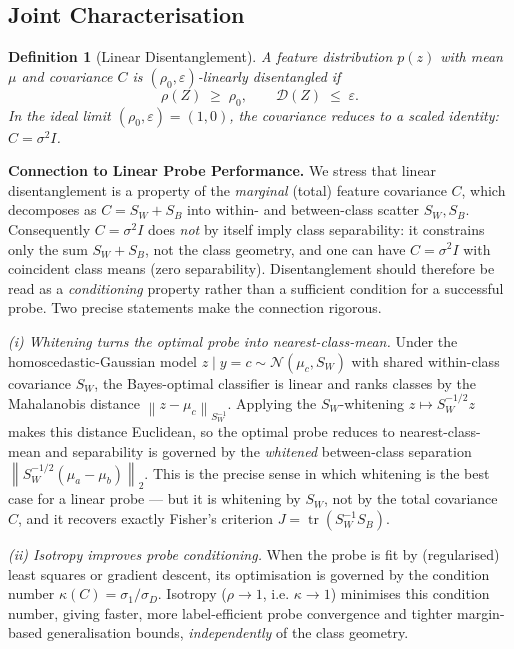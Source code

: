 \documentclass[11pt,a4paper]{article}
\newtheorem{definition}[theorem]{Definition}
\newcommand{\norm}[1]{\left\|#1\right\|}
\newcommand{\tr}{\operatorname{tr}}
\begin{document}
\subsection{Joint Characterisation}
\label{sec:joint}

\begin{definition}[Linear Disentanglement]
\label{def:ld}
A feature distribution $p(z)$ with mean $\mu$ and covariance $C$ is
\emph{$(\rho_0, \varepsilon)$-linearly disentangled} if
\begin{equation}
    \rho(Z) \;\ge\; \rho_0, \qquad
    \mathcal{D}(Z) \;\le\; \varepsilon.
\label{eq:ld_def}
\end{equation}
In the ideal limit $(\rho_0, \varepsilon) = (1, 0)$, the covariance reduces to a
scaled identity: $C = \sigma^2 I$.
\end{definition}

\noindent\textbf{Connection to Linear Probe Performance.}\;
We stress that linear disentanglement is a property of the \emph{marginal}
(total) feature covariance $C$, which decomposes as $C = S_W + S_B$ into
within- and between-class scatter $S_W, S_B$.  Consequently $C = \sigma^2 I$
does \emph{not} by itself imply class separability: it constrains only the sum
$S_W + S_B$, not the class geometry, and one can have $C = \sigma^2 I$ with
coincident class means (zero separability).  Disentanglement should therefore be
read as a \emph{conditioning} property rather than a sufficient condition for a
successful probe.  Two precise statements make the connection rigorous.

\emph{(i) Whitening turns the optimal probe into nearest-class-mean.}
Under the homoscedastic-Gaussian model $z \mid y{=}c \sim
\mathcal{N}(\mu_c, S_W)$ with shared within-class covariance $S_W$, the
Bayes-optimal classifier is linear and ranks classes by the Mahalanobis distance
$\norm{z-\mu_c}_{S_W^{-1}}$.  Applying the $S_W$-whitening $z \mapsto
S_W^{-1/2}z$ makes this distance Euclidean, so the optimal probe reduces to
nearest-class-mean and separability is governed by the \emph{whitened}
between-class separation $\norm{S_W^{-1/2}(\mu_a-\mu_b)}_2$.  This is the precise
sense in which whitening is the best case for a linear probe — but it is
whitening by $S_W$, not by the total covariance $C$, and it recovers exactly
Fisher's criterion $J = \tr(S_W^{-1}S_B)$.

\emph{(ii) Isotropy improves probe conditioning.}
When the probe is fit by (regularised) least squares or gradient descent, its
optimisation is governed by the condition number $\kappa(C) =
\sigma_1/\sigma_D$.  Isotropy ($\rho \to 1$, i.e. $\kappa \to 1$) minimises this
condition number, giving faster, more label-efficient probe convergence and
tighter margin-based generalisation bounds, \emph{independently} of the class
geometry.
\end{document}

